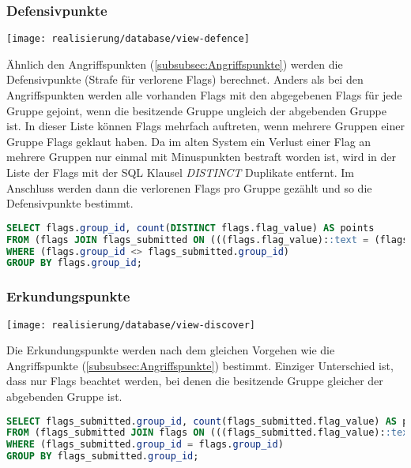 \subsubsection{Defensivpunkte}
\begin{center}
	\texttt{[image: realisierung/database/view-defence]}
	\label{fig:realisierung-view-defence}
\end{center}

Ähnlich den Angriffspunkten (\ref{subsubsec:Angriffspunkte}) werden die Defensivpunkte (Strafe für verlorene Flags) berechnet.
Anders als bei den Angriffspunkten werden alle vorhanden Flags mit den abgegebenen Flags für jede Gruppe gejoint, wenn die besitzende Gruppe ungleich der abgebenden Gruppe ist. In dieser Liste können Flags mehrfach auftreten, wenn mehrere Gruppen einer Gruppe Flags geklaut haben. Da im alten System ein Verlust einer Flag an mehrere Gruppen nur einmal mit Minuspunkten bestraft worden ist, wird in der Liste der Flags mit der SQL Klausel \textit{DISTINCT} Duplikate entfernt. Im Anschluss werden dann die verlorenen Flags pro Gruppe gezählt und so die Defensivpunkte bestimmt.

\begin{lstlisting}[frame=single, language=sql, caption={SQL View Denfensivpunkte}, captionpos=b, label={lst:database-offence-points}]
SELECT flags.group_id, count(DISTINCT flags.flag_value) AS points
FROM (flags JOIN flags_submitted ON (((flags.flag_value)::text = (flags_submitted.flag_value)::text)))
WHERE (flags.group_id <> flags_submitted.group_id)
GROUP BY flags.group_id;
\end{lstlisting}

\subsubsection{Erkundungspunkte}
\begin{center}
	\texttt{[image: realisierung/database/view-discover]}
	\label{fig:realisierung-view-discover}
\end{center}

Die Erkundungspunkte werden nach dem gleichen Vorgehen wie die Angriffspunkte (\ref{subsubsec:Angriffspunkte}) bestimmt. Einziger Unterschied ist, dass nur Flags beachtet werden, bei denen die besitzende Gruppe gleicher der abgebenden Gruppe ist.

\begin{lstlisting}[frame=single, language=sql, caption={SQL View Erkundungspunkte}, captionpos=b, label={lst:database-offence-points}]
SELECT flags_submitted.group_id, count(flags_submitted.flag_value) AS points
FROM (flags_submitted JOIN flags ON (((flags_submitted.flag_value)::text = (flags.flag_value)::text)))
WHERE (flags_submitted.group_id = flags.group_id)
GROUP BY flags_submitted.group_id;
\end{lstlisting}

